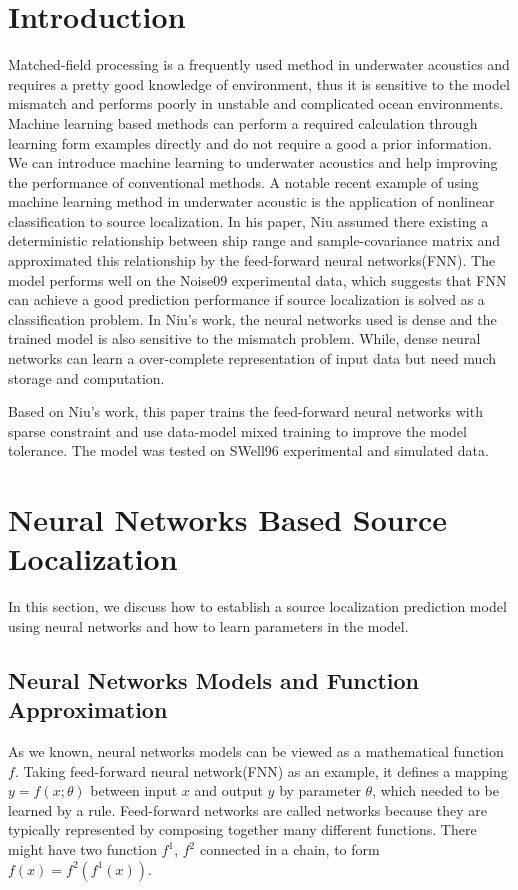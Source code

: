 \section{Introduction}
Matched-field processing is a frequently used method in underwater acoustics and requires a pretty good knowledge of environment, thus it is sensitive to the model mismatch and performs poorly in unstable and complicated ocean environments\cite{baggeroer1993overview}.
Machine learning based methods can perform a required calculation through learning form examples directly and do not require a good a prior information. We can introduce machine learning to underwater acoustics and help
improving the performance of conventional methods.
A notable recent example of using machine learning method in underwater acoustic is the application of nonlinear classification to source localization\cite{niu2017source}.
In his paper, Niu assumed there existing a deterministic relationship between ship range and sample-covariance matrix and approximated this relationship by the feed-forward neural networks(FNN).
The model performs well on the Noise09 experimental data, which suggests that FNN can achieve a good prediction performance if source localization is solved as a classification problem.
In Niu's work, the neural networks used is dense and the trained model is also sensitive to the mismatch problem. While, dense neural networks can learn a over-complete
representation of input data but need much storage and computation.

Based on Niu's work, this paper trains the feed-forward neural networks with sparse constraint and use data-model mixed training to improve the model tolerance. The model was tested on SWell96 experimental and simulated data.


\section{Neural Networks Based Source Localization}
In this section, we discuss how to establish a source localization prediction model using neural networks and how to learn parameters in the model.

\subsection{Neural Networks Models and Function Approximation}
As we known, neural networks models can be viewed as a mathematical function $f$. Taking feed-forward neural network(FNN) as an example, it defines a mapping ${{y}}=f(x;\theta )$ between input $x$ and output $y$ by parameter $\theta$, which needed to be learned by a rule. Feed-forward networks are called networks because they are typically represented by composing together many different functions. There might have two function $f^{1}$, $f^{2}$ connected in a chain\cite{goodfellow2016deep}, to form
$f(x) = f^{2}(f^{1}(x))$.

